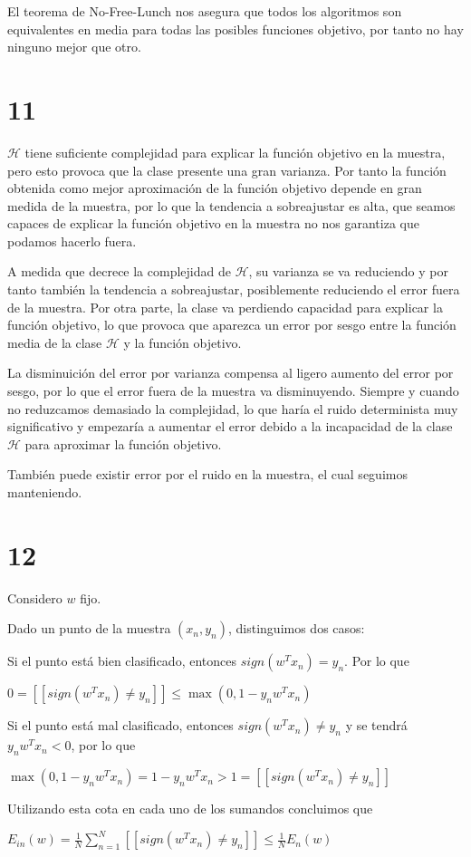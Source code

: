 \documentclass{article}
\begin{document}
El teorema de No-Free-Lunch nos asegura que todos los algoritmos son
equivalentes en media para todas las posibles funciones objetivo, por
tanto no hay ninguno mejor que otro.

\section{11}

\( \mathcal{H} \) tiene suficiente complejidad para explicar la
función objetivo en la muestra, pero esto provoca que la clase
presente una gran varianza. Por tanto la función obtenida como mejor
aproximación de la función objetivo depende en gran medida de la
muestra, por lo que la tendencia a sobreajustar es alta, que seamos
capaces de explicar la función objetivo en la muestra no nos garantiza
que podamos hacerlo fuera.

A medida que decrece la complejidad de \( \mathcal{H} \), su varianza
se va reduciendo y por tanto también la tendencia a sobreajustar,
posiblemente reduciendo el error fuera de la muestra.  Por otra parte,
la clase va perdiendo capacidad para explicar la función objetivo, lo
que provoca que aparezca un error por sesgo entre la función media de
la clase \( \mathcal{H} \) y la función objetivo.

La disminuición del error por varianza compensa al ligero aumento del
error por sesgo, por lo que el error fuera de la muestra va
disminuyendo. Siempre y cuando no reduzcamos demasiado la complejidad,
lo que haría el ruido determinista muy significativo y empezaría a
aumentar el error debido a la incapacidad de la clase
\( \mathcal{H} \) para aproximar la función objetivo.


También puede existir error por el ruido en la muestra, el cual seguimos
manteniendo.

\section{12}

Considero \(w\) fijo.

Dado un punto de la muestra \( (x_n,y_n) \), distinguimos dos casos:

Si el punto está bien clasificado, entonces \( sign(w^T x_n)=y_n
\). Por lo que

\( 0=[[sign(w^T x_n)\neq y_n]]\leq \max(0,1-y_n w^T x_n) \)

Si el punto está mal clasificado, entonces \( sign(w^T x_n)\neq y_n \)
y se tendrá \( y_n w^T x_n < 0 \), por lo que

\( \max(0,1-y_n w^T x_n)=1-y_n w^T x_n > 1 = [[sign(w^T x_n) \neq y_n]] \)


Utilizando esta cota en cada uno de los sumandos concluimos que

\( E_{in}(w)=\frac{1}{N}\sum_{n=1}^N [[sign(w^T x_n)\neq y_n]]\leq\frac{1}{N}E_n(w) \)
\end{document}
